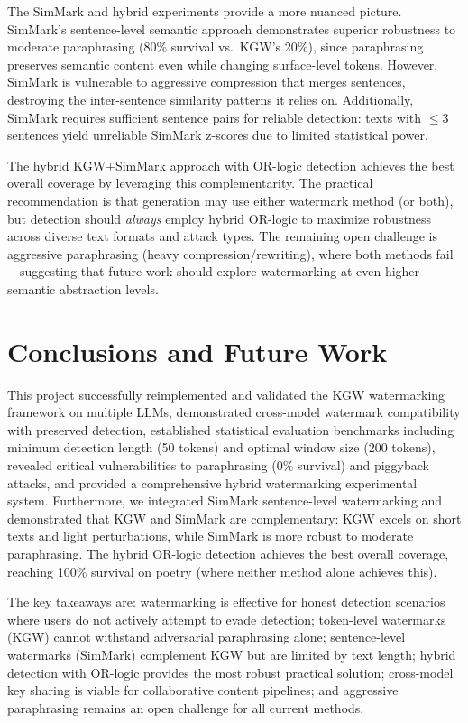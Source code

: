 \documentclass[12pt,letterpaper]{article}
\begin{document}
The SimMark and hybrid experiments provide a more nuanced picture. SimMark's sentence-level semantic approach demonstrates superior robustness to moderate paraphrasing (80\% survival vs.\ KGW's 20\%), since paraphrasing preserves semantic content even while changing surface-level tokens. However, SimMark is vulnerable to aggressive compression that merges sentences, destroying the inter-sentence similarity patterns it relies on. Additionally, SimMark requires sufficient sentence pairs for reliable detection: texts with $\leq 3$ sentences yield unreliable SimMark z-scores due to limited statistical power.

The hybrid KGW+SimMark approach with OR-logic detection achieves the best overall coverage by leveraging this complementarity. The practical recommendation is that generation may use either watermark method (or both), but detection should \textit{always} employ hybrid OR-logic to maximize robustness across diverse text formats and attack types. The remaining open challenge is aggressive paraphrasing (heavy compression/rewriting), where both methods fail---suggesting that future work should explore watermarking at even higher semantic abstraction levels.

\section{Conclusions and Future Work}

This project successfully reimplemented and validated the KGW watermarking framework on multiple LLMs, demonstrated cross-model watermark compatibility with preserved detection, established statistical evaluation benchmarks including minimum detection length (50 tokens) and optimal window size (200 tokens), revealed critical vulnerabilities to paraphrasing (0\% survival) and piggyback attacks, and provided a comprehensive hybrid watermarking experimental system. Furthermore, we integrated SimMark sentence-level watermarking and demonstrated that KGW and SimMark are complementary: KGW excels on short texts and light perturbations, while SimMark is more robust to moderate paraphrasing. The hybrid OR-logic detection achieves the best overall coverage, reaching 100\% survival on poetry (where neither method alone achieves this).

The key takeaways are: watermarking is effective for honest detection scenarios where users do not actively attempt to evade detection; token-level watermarks (KGW) cannot withstand adversarial paraphrasing alone; sentence-level watermarks (SimMark) complement KGW but are limited by text length; hybrid detection with OR-logic provides the most robust practical solution; cross-model key sharing is viable for collaborative content pipelines; and aggressive paraphrasing remains an open challenge for all current methods.
\end{document}

